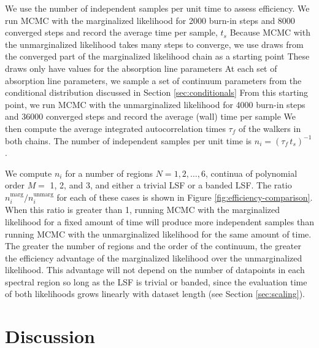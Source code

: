 \documentclass[manuscript]{aastex62}
\begin{document}
We use the number of independent samples per unit time to assess efficiency.
We run MCMC with the marginalized likelihood for 2000 burn-in steps and 8000 converged steps and record the average time per sample, $t_s$
Because MCMC with the unmarginalized likelihood takes many steps to converge, we use draws from the converged part of the marginalized likelihood chain as a starting point
These draws only have values for the absorption line parameters
At each set of absorption line parameters, we sample a set of continuum parameters from the conditional distribution discussed in Section \ref{sec:conditionals}
From this starting point, we run MCMC with the unmarginalized likelihood for 4000 burn-in steps and 36000 converged steps and record the average (wall) time per sample
We then compute the average integrated autocorrelation times $\tau_f$ of the walkers in both chains.
The number of independent samples per unit time is $n_i = \left(\tau_f \, t_s \right)^{-1}$.

We compute $n_i$ for a number of regions $N = 1, 2, \ldots, 6$, continua of polynomial order $M=$ 1, 2, and 3, and either a trivial LSF or a banded LSF.
The ratio $n_i^{\text{marg}} / n_i^{\text{unmarg}}$ for each of these cases is shown in Figure \ref{fig:efficiency-comparison}.
When this ratio is greater than 1, running MCMC with the marginalized likelihood for a fixed amount of time will produce more independent samples than running MCMC with the unmarginalized likelihood for the same amount of time.
The greater the number of regions and the order of the continuum, the greater the efficiency advantage of the marginalized likelihood over the unmarginalized likelihood.
This advantage will not depend on the number of datapoints in each spectral region so long as the LSF is trivial or banded, since the evaluation time of both likelihoods grows linearly with dataset length (see Section \ref{sec:scaling}).


\section{Discussion}
\label{sec:discussion}
\end{document}
